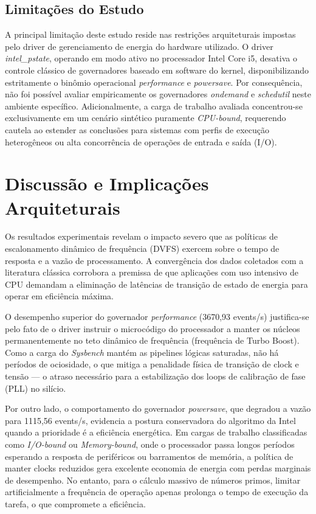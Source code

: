 \documentclass[12pt]{article}
\begin{document}
\subsection{Limitações do Estudo}

A principal limitação deste estudo reside nas restrições arquiteturais impostas pelo driver de gerenciamento de energia do hardware utilizado. O driver \textit{intel\_pstate}, operando em modo ativo no processador Intel Core i5, desativa o controle clássico de governadores baseado em software do kernel, disponibilizando estritamente o binômio operacional \textit{performance} e \textit{powersave}. Por consequência, não foi possível avaliar empiricamente os governadores \textit{ondemand} e \textit{schedutil} neste ambiente específico. Adicionalmente, a carga de trabalho avaliada concentrou-se exclusivamente em um cenário sintético puramente \textit{CPU-bound}, requerendo cautela ao estender as conclusões para sistemas com perfis de execução heterogêneos ou alta concorrência de operações de entrada e saída (I/O).


\section{Discussão e Implicações Arquiteturais}

Os resultados experimentais revelam o impacto severo que as políticas de escalonamento dinâmico de frequência (DVFS) exercem sobre o tempo de resposta e a vazão de processamento. A convergência dos dados coletados com a literatura clássica \cite{spiliopoulos2011, hebbar2021} corrobora a premissa de que aplicações com uso intensivo de CPU demandam a eliminação de latências de transição de estado de energia para operar em eficiência máxima.

O desempenho superior do governador \textit{performance} (3670,93 events/s) justifica-se pelo fato de o driver instruir o microcódigo do processador a manter os núcleos permanentemente no teto dinâmico de frequência (frequência de Turbo Boost). Como a carga do \textit{Sysbench} mantém as pipelines lógicas saturadas, não há períodos de ociosidade, o que mitiga a penalidade física de transição de clock e tensão — o atraso necessário para a estabilização dos loops de calibração de fase (PLL) no silício.

Por outro lado, o comportamento do governador \textit{powersave}, que degradou a vazão para 1115,56 events/s, evidencia a postura conservadora do algoritmo da Intel quando a prioridade é a eficiência energética. Em cargas de trabalho classificadas como \textit{I/O-bound} ou \textit{Memory-bound}, onde o processador passa longos períodos esperando a resposta de periféricos ou barramentos de memória, a política de manter clocks reduzidos gera excelente economia de energia com perdas marginais de desempenho. No entanto, para o cálculo massivo de números primos, limitar artificialmente a frequência de operação apenas prolonga o tempo de execução da tarefa, o que compromete a eficiência.
\end{document}
